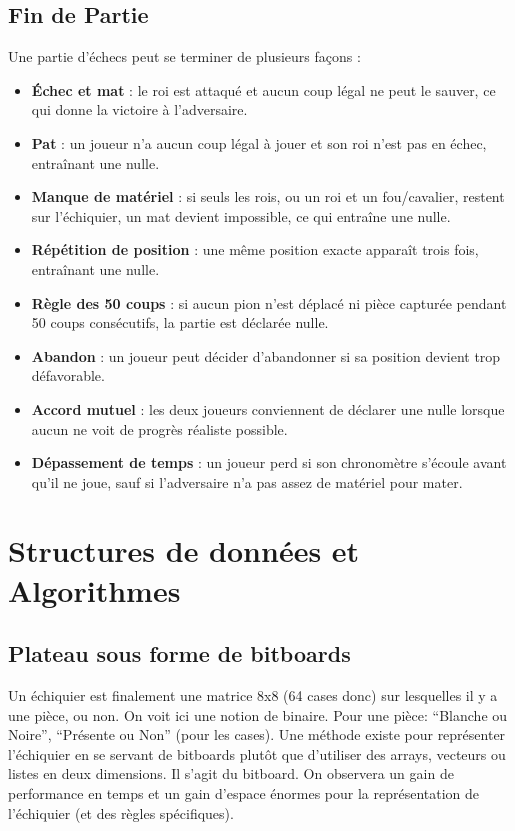 \documentclass{article}
\begin{document}
\subsection{Fin de Partie}
Une partie d'échecs peut se terminer de plusieurs façons :
\begin{itemize}
    \item \textbf{Échec et mat} : le roi est attaqué et aucun coup légal ne peut le sauver, ce qui donne la victoire à l'adversaire.
    \item \textbf{Pat} : un joueur n'a aucun coup légal à jouer et son roi n'est pas en échec, entraînant une nulle.
    \item \textbf{Manque de matériel} : si seuls les rois, ou un roi et un fou/cavalier, restent sur l'échiquier, un mat devient impossible, ce qui entraîne une nulle.
    \item \textbf{Répétition de position} : une même position exacte apparaît trois fois, entraînant une nulle.
    \item \textbf{Règle des 50 coups} : si aucun pion n'est déplacé ni pièce capturée pendant 50 coups consécutifs, la partie est déclarée nulle.
    \item \textbf{Abandon} : un joueur peut décider d'abandonner si sa position devient trop défavorable.
    \item \textbf{Accord mutuel} : les deux joueurs conviennent de déclarer une nulle lorsque aucun ne voit de progrès réaliste possible.
    \item \textbf{Dépassement de temps} : un joueur perd si son chronomètre s'écoule avant qu'il ne joue, sauf si l'adversaire n'a pas assez de matériel pour mater.
\end{itemize}


\section{Structures de données et Algorithmes}
\label{DataStruct}

\subsection{Plateau sous forme de bitboards}
Un échiquier est finalement une matrice 8x8 (64 cases donc) sur lesquelles il y a une pièce, ou non. On voit ici une
notion de binaire. Pour une pièce: ``Blanche ou Noire'', ``Présente ou Non'' (pour les cases). Une méthode existe pour
représenter l'échiquier en se servant de bitboards plutôt que d'utiliser des arrays, vecteurs ou listes en deux dimensions.
Il s'agit du bitboard. On observera un gain de performance en temps et un gain d'espace énormes pour la représentation
de l'échiquier (et des règles spécifiques).
\end{document}
